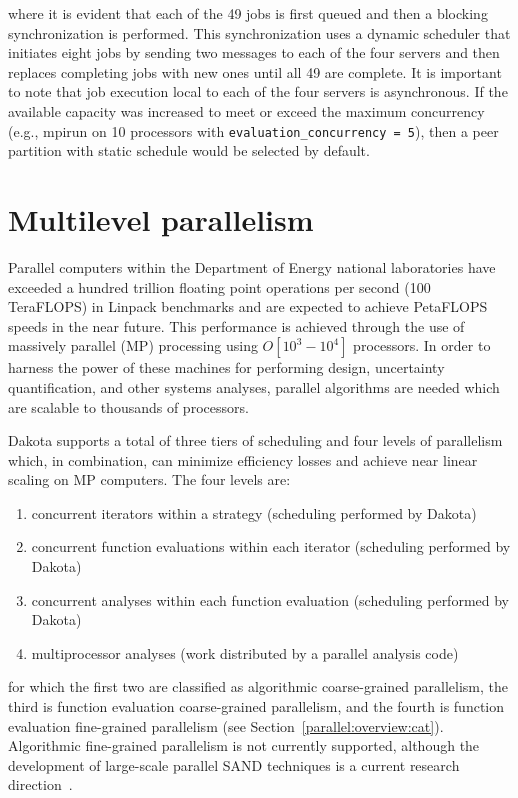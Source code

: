 where it is evident that each of the 49 jobs is first queued and then
a blocking synchronization is performed.  This synchronization uses a
dynamic scheduler that initiates eight jobs by sending two messages to
each of the four servers and then replaces completing jobs with new
ones until all 49 are complete.  It is important to note that job
execution local to each of the four servers is asynchronous.  If the
available capacity was increased to meet or exceed the maximum
concurrency (e.g., mpirun on 10 processors with
\texttt{evaluation\_concurrency = 5}), then a peer partition with
static schedule would be selected by default.


\section{Multilevel parallelism} \label{parallel:MLP}


Parallel computers within the Department of Energy national
laboratories have exceeded a hundred trillion floating point
operations per second (100 TeraFLOPS) in Linpack benchmarks and are
expected to achieve PetaFLOPS speeds in the near future. This
performance is achieved through the use of massively parallel (MP)
processing using $O[10^{3}-10^{4}]$ processors. In order to harness
the power of these machines for performing design, uncertainty
quantification, and other systems analyses, parallel algorithms are
needed which are scalable to thousands of processors.

Dakota supports a total of three tiers of scheduling and four levels
of parallelism which, in combination, can minimize efficiency losses
and achieve near linear scaling on MP computers. The four levels are:
\begin{enumerate}
\item concurrent iterators within a strategy (scheduling performed by
  Dakota)

\item concurrent function evaluations within each iterator (scheduling
  performed by Dakota)

\item concurrent analyses within each function evaluation (scheduling
  performed by Dakota)

\item multiprocessor analyses (work distributed by a parallel
  analysis code)
\end{enumerate}
for which the first two are classified as algorithmic coarse-grained
parallelism, the third is function evaluation coarse-grained
parallelism, and the fourth is function evaluation fine-grained
parallelism (see Section~\ref{parallel:overview:cat}). Algorithmic
fine-grained parallelism is not currently supported, although the
development of large-scale parallel SAND techniques is a current
research direction~\cite{Bar01b}.

